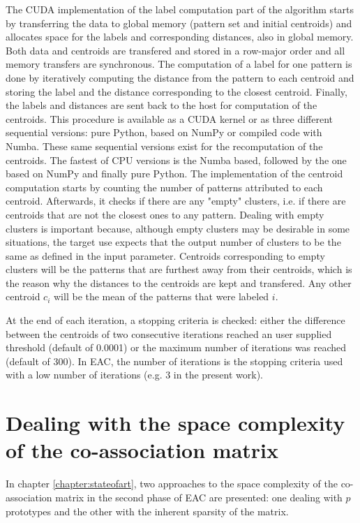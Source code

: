 The CUDA implementation of the label computation part of the algorithm starts by transferring the data to global memory (pattern set and initial centroids) and allocates space for the labels and corresponding distances, also in global memory.
Both data and centroids are transfered and stored in a row-major order and all memory transfers are synchronous.
The computation of a label for one pattern is done by iteratively computing the distance from the pattern to each centroid and storing the label and the distance corresponding to the closest centroid.
Finally, the labels and distances are sent back to the host for computation of the centroids.
This procedure is available as a CUDA kernel or as three different sequential versions: pure Python, based on NumPy or compiled code with Numba.
These same sequential versions exist for the recomputation of the centroids.
The fastest of CPU versions is the Numba based, followed by the one based on NumPy and finally pure Python.
The implementation of the centroid computation starts by counting the number of patterns attributed to each centroid.
Afterwards, it checks if there are any "empty" clusters, i.e. if there are centroids that are not the closest ones to any pattern.
Dealing with empty clusters is important because, although empty clusters may be desirable in some situations, the target use expects that the output number of clusters to be the same as defined in the input parameter.
Centroids corresponding to empty clusters will be the patterns that are furthest away from their centroids, which is the reason why the distances to the centroids are kept and transfered.
Any other centroid $c_i$ will be the mean of the patterns that were labeled $i$.

At the end of each iteration, a stopping criteria is checked: either the difference between the centroids of two consecutive iterations reached an user supplied threshold (default of 0.0001) or the maximum number of iterations was reached (default of 300).
In EAC, the number of iterations is the stopping criteria used with a low number of iterations (e.g. 3 in the present work).


\section{Dealing with the space complexity of the co-association matrix}

In chapter \ref{chapter:stateofart}, two approaches to the space complexity of the co-association matrix in the second phase of EAC are presented: one dealing with $p$ prototypes and the other with the inherent sparsity of the matrix. 

